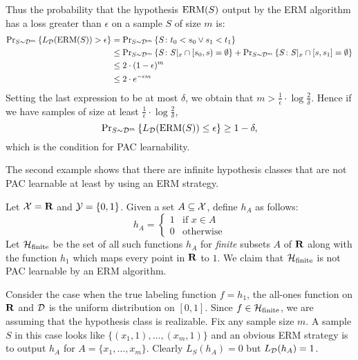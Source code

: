 \begin{example}
Thus the probability that the hypothesis $\operatorname{ERM}(S)$ output by the ERM algorithm 
has a loss greater than $\epsilon$ on a sample $S$ of size $m$ is:
\begin{align*}
    \text{Pr}_{S \sim \mathcal{D}^m} \left \{ L_{\mathcal{D}} (\operatorname{ERM}(S)) > \epsilon \right \} 
     & = \text{Pr}_{S \sim \mathcal{D}^m} \left \{ S \colon t_0 < s_0 \vee s_1 < t_1 \right \} \\
     & \leq  \text{Pr}_{S \sim \mathcal{D}^m} \left \{ S \colon S|_x \cap [s_0, s) = \emptyset \right \} + 
             \text{Pr}_{S \sim \mathcal{D}^m} \left \{ S \colon S|_x \cap [s, s_1] = \emptyset \right \} \\      
     & \leq 2 \cdot (1 - \epsilon)^m \\
     & \leq 2 \cdot e^{- \epsilon m}
\end{align*}
Setting the last expression to be at most $\delta$, we obtain that 
$m > \frac{1}{\epsilon} \cdot \log \frac{2}{\delta}$. Hence if we have samples 
of size at least $\frac{1}{\epsilon} \cdot \log \frac{2}{\delta}$, 
\[
    \text{Pr}_{S \sim \mathcal{D}^m} \left \{ L_{\mathcal{D}} (\operatorname{ERM}(S)) \leq \epsilon \right \} \geq 1 - \delta, 
\]
which is the condition for PAC learnability.
\end{example}

The second example shows that there are infinite hypothesis classes that are not
PAC learnable at least by using an ERM strategy.

\begin{example} 
Let $\mathcal{X} = \mathbf{R}$ and $\mathcal{Y} = \{0, 1\}$. Given a set $A \subseteq \mathcal{X}$,
define $h_A$ as follows:
\[
    h_A = \left \{ \begin{array}{ll} 
                        1 & \text{if } x \in A \\
                        0 & \text{otherwise}
                   \end{array}\right .
\]
Let $\mathcal{H}_{\text{finite}}$ be the set of all such functions $h_A$ for \emph{finite} 
subsets $A$ of $\mathbf{R}$ along with the function $h_{1}$ which maps every point in $\mathbf{R}$ 
to $1$. We claim that $\mathcal{H}_{\text{finite}}$ is not PAC learnable by an ERM algorithm. 

Consider the case when the true labeling function $f = h_1$, the all-ones
function on $\mathbf{R}$ and $\mathcal{D}$ is the uniform distribution on $[0, 1]$. Since
$f \in \mathcal{H}_{\text{finite}}$, we are assuming that the hypothesis class is
realizable. Fix any sample size $m$. A sample $S$ in this case looks like
$\{(x_1, 1), \ldots, (x_m, 1)\}$ and an obvious ERM strategy is to output $h_A$
for $A = \{x_1, \ldots, x_m\}$. Clearly $L_S (h_A) = 0$ but $L_{\mathcal{D}} (h_A) =
1$.  
\end{example} 

